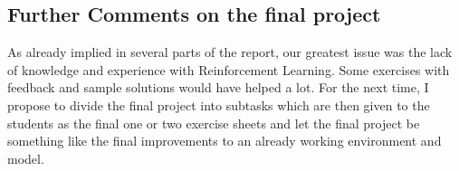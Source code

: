 \subsection{Further Comments on the final project}
As already implied in several parts of the report, our greatest issue was the lack of knowledge and experience with Reinforcement Learning. Some exercises with feedback and sample solutions would have helped a lot. For the next time, I propose to divide the final project into subtasks which are then given to the students as the final one or two exercise sheets and let the final project be something like the final improvements to an already working environment and model.